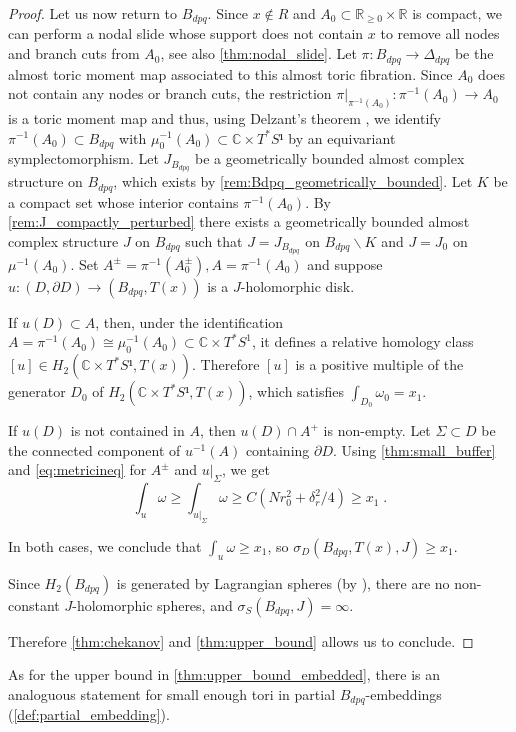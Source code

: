 \documentclass[12pt,a4paper,abstract=true,draft]{scrartcl}
\begin{document}
\begin{proof}
  Let us now return to $B_{dpq}$.
  Since $x \notin R$ and $A_0 \subset \mathbb{R}_{≥ 0} \times \mathbb{R}$ is compact, we can perform a nodal slide whose support does not contain $x$ to remove all nodes and branch cuts from $A_0$, see also \cref{thm:nodal_slide}.
  Let $\pi \colon B_{dpq} \rightarrow \Delta_{dpq}$ be the almost toric moment map associated to this almost toric fibration.
  Since $A_0$ does not contain any nodes or branch cuts, the restriction $\pi\vert_{\pi^{-1}(A_0)} \colon \pi^{-1}(A_0) \rightarrow A_0$ is a toric moment map and thus, using Delzant's theorem \cite[Theorem 2.1]{Del88}, we identify $\pi^{-1}(A_0) ⊂ B_{dpq}$ with $μ_0^{-1}(A_0) ⊂ ℂ × T^* S¹$ by an equi\-va\-ri\-ant symplectomorphism.
  Let $J_{B_{dpq}}$ be a geometrically bounded almost complex structure on $B_{dpq}$, which exists by \cref{rem:Bdpq_geometrically_bounded}.
  Let $K$ be a compact set whose interior contains $π^{-1}(A_0)$.
  By \cref{rem:J_compactly_perturbed} there exists a geometrically bounded almost complex structure $J$ on $B_{dpq}$ such that $J=J_{B_{dpq}}$ on $B_{dpq} ∖ K$ and $J=J_0$ on $μ^{-1}(A_0)$.
  Set $A^± = \pi^{-1}(A_0^±), A = \pi^{-1}(A_0)$ and suppose $u\colon (D,∂D) → (B_{dpq}, T(x))$ is a $J$-holomorphic disk. 
  
  If $u(D) ⊂ A$, then, under the identification $A=\pi^{-1}(A_0) \cong μ_0^{-1}(A_0) \subset \mathbb{C} \times T^*S^1$, it defines a relative homology class $[u] ∈ H_2(ℂ × T^*S¹, T(x))$.
Therefore $[u]$ is a positive multiple of the generator $D_0$ of $H_2(ℂ × T^*S¹, T(x))$, which satisfies $∫_{D_0} ω_0 = x_1$.
  
  If $u(D)$ is not contained in $A$, then $u(D) ∩ A^+$ is non-empty.
Let $Σ ⊂ D$ be the connected component of $u^{-1}(A)$ containing $∂D$.
Using \cref{thm:small_buffer} and \eqref{eq:metricineq} for $A^±$ and $u|_Σ$, we get
  \[∫_u ω ≥ ∫_{u|_Σ} ω ≥ C(Nr_0^2 + δ_r^2/4) ≥ x_1 \;. \]

In both cases, we conclude that $∫_{u} ω ≥ x_1$, so $σ_D(B_{dpq},T(x),J) ≥ x_1$.

Since $H_2(B_{dpq})$ is generated by Lagrangian spheres (by \cite[Lemma 7.11]{evans2021atfs}), there are no non-constant $J$-holomorphic spheres, and $σ_S(B_{dpq},J) = ∞$.

Therefore \cref{thm:chekanov} and \cref{thm:upper_bound} allows us to conclude.
\end{proof}

As for the upper bound in \cref{thm:upper_bound_embedded}, there is an analoguous statement for small enough tori in partial $B_{dpq}$-embeddings (\cref{def:partial_embedding}).
\end{document}
